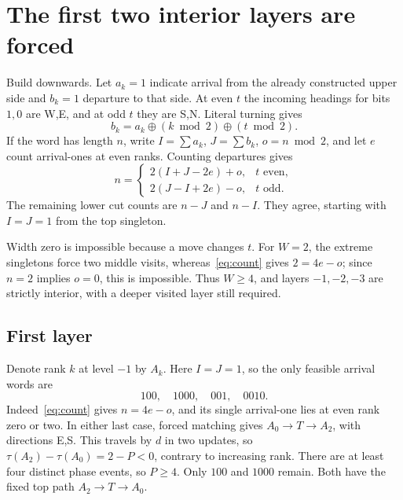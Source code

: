 \documentclass[11pt]{article}
\newcommand{\xor}{\mathbin{\oplus}}
\begin{document}
\section{The first two interior layers are forced}
Build downwards. Let $a_k=1$ indicate arrival from the already constructed
upper side and $b_k=1$ departure to that side. At even $t$ the incoming headings
for bits $1,0$ are W,E, and at odd $t$ they are S,N. Literal turning gives
\begin{equation}\label{eq:port}
 b_k=a_k\xor(k\bmod2)\xor(t\bmod2).
\end{equation}
If the word has length $n$, write $I=\sum a_k$, $J=\sum b_k$, $o=n\bmod2$,
and let $e$ count arrival-ones at even ranks. Counting departures gives
\begin{equation}\label{eq:count}
 n=\begin{cases}2(I+J-2e)+o,&t\text{ even},\\
                 2(J-I+2e)-o,&t\text{ odd}.
    \end{cases}
\end{equation}
The remaining lower cut counts are $n-J$ and $n-I$. They agree, starting
with $I=J=1$ from the top singleton.

Width zero is impossible because a move changes $t$. For $W=2$, the extreme
singletons force two middle visits, whereas~\eqref{eq:count} gives $2=4e-o$;
since $n=2$ implies $o=0$, this is impossible. Thus $W\ge4$, and layers
$-1,-2,-3$ are strictly interior, with a deeper visited layer still required.

\subsection{First layer}
Denote rank $k$ at level $-1$ by $A_k$. Here $I=J=1$, so the only feasible
arrival words are
\[
 100,\quad1000,\quad001,\quad0010.
\]
Indeed~\eqref{eq:count} gives $n=4e-o$, and its single arrival-one lies at
even rank zero or two. In either last case, forced matching gives
$A_0\to T\to A_2$, with directions E,S. This travels by $d$ in two updates,
so $\tau(A_2)-\tau(A_0)=2-P<0$, contrary to increasing rank. There are at
least four distinct phase events, so $P\ge4$. Only $100$ and $1000$ remain.
Both have the fixed top path $A_2\to T\to A_0$.
\end{document}

